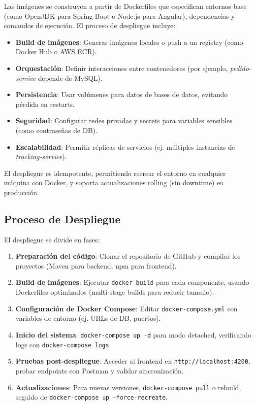 \documentclass[a4paper,12pt]{article}
\begin{document}
Las imágenes se construyen a partir de Dockerfiles que especifican entornos base (como OpenJDK para Spring Boot o Node.js para Angular), dependencias y comandos de ejecución. El proceso de despliegue incluye:
\begin{itemize}
    \item \textbf{Build de imágenes}: Generar imágenes locales o push a un registry (como Docker Hub o AWS ECR).
    \item \textbf{Orquestación}: Definir interacciones entre contenedores (por ejemplo, \textit{pedido-service} depende de MySQL).
    \item \textbf{Persistencia}: Usar volúmenes para datos de bases de datos, evitando pérdida en restarts.
    \item \textbf{Seguridad}: Configurar redes privadas y secrets para variables sensibles (como contraseñas de DB).
    \item \textbf{Escalabilidad}: Permitir réplicas de servicios (ej. múltiples instancias de \textit{tracking-service}).
\end{itemize}

El despliegue es idempotente, permitiendo recrear el entorno en cualquier máquina con Docker, y soporta actualizaciones rolling (sin downtime) en producción.

\subsection{Proceso de Despliegue}
El despliegue se divide en fases:
\begin{enumerate}
    \item \textbf{Preparación del código}: Clonar el repositorio de GitHub y compilar los proyectos (Maven para backend, npm para frontend).
    \item \textbf{Build de imágenes}: Ejecutar \texttt{docker build} para cada componente, usando Dockerfiles optimizados (multi-stage builds para reducir tamaño).
    \item \textbf{Configuración de Docker Compose}: Editar \texttt{docker-compose.yml} con variables de entorno (ej. URLs de DB, puertos).
    \item \textbf{Inicio del sistema}: \texttt{docker-compose up -d} para modo detached, verificando logs con \texttt{docker-compose logs}.
    \item \textbf{Pruebas post-despliegue}: Acceder al frontend en \texttt{http://localhost:4200}, probar endpoints con Postman y validar sincronización.
    \item \textbf{Actualizaciones}: Para nuevas versiones, \texttt{docker-compose pull} o rebuild, seguido de \texttt{docker-compose up --force-recreate}.
\end{enumerate}
\end{document}
